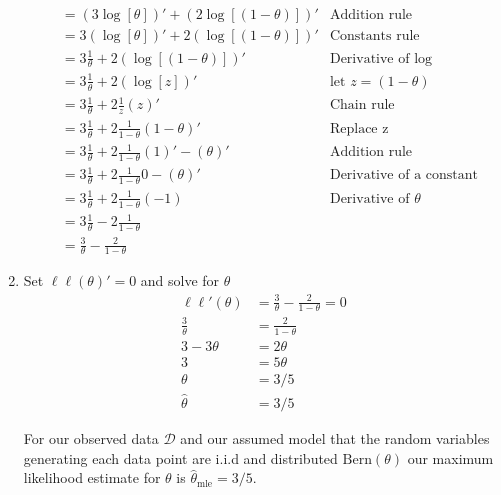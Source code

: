 \begin{enumerate}
\begin{align*}
                             &= \left( 3 \log [\theta] \right)' + \left(2 \log [ (1-\theta)] \right)' & \text{Addition rule}\\
                             &= 3 \left( \log [\theta] \right)' + 2 \left( \log [ (1-\theta)] \right)' & \text{Constants rule}\\
                             &= 3 \frac{1}{\theta} + 2 \left( \log [ (1-\theta)] \right)' & \text{Derivative of log}\\
                             &= 3 \frac{1}{\theta} + 2 \left( \log [ z ] \right)' & \text{let } z=(1-\theta)\\
                             &= 3 \frac{1}{\theta} + 2 \frac{1}{z} (z)' & \text{Chain rule } \\
                             &= 3 \frac{1}{\theta} + 2 \frac{1}{1-\theta} (1-\theta)' & \text{Replace z} \\
                             &= 3 \frac{1}{\theta} + 2 \frac{1}{1-\theta} (1)' - (\theta)' & \text{Addition rule} \\
                             &= 3 \frac{1}{\theta} + 2 \frac{1}{1-\theta} 0 - (\theta)' & \text{Derivative of a constant} \\
                             &= 3 \frac{1}{\theta} + 2 \frac{1}{1-\theta} (-1) & \text{Derivative of } \theta \\
                             &= 3 \frac{1}{\theta} - 2 \frac{1}{1-\theta}\\
                             &= \frac{3}{\theta} -  \frac{2}{1-\theta}
    \end{align*}
    \item Set $\ell \ell(\theta)' = 0$ and solve for $\theta$
    \begin{align*}
        \ell \ell ' (\theta) &= \frac{3}{\theta} -  \frac{2}{1-\theta} = 0\\
        \frac{3}{\theta} &=  \frac{2}{1-\theta}\\
        3 - 3\theta &=  2 \theta \\
        3  &=  5 \theta \\
        \theta &= 3/5\\ 
        \hat {\theta} &= 3/5 
    \end{align*}

For our observed data $\mathcal{D}$ and our assumed model that the random variables generating each data point are i.i.d and distributed $\text{Bern}(\theta)$ our maximum likelihood estimate for $\theta$ is $\hat{\theta}_{\text{mle}} = 3/5$.

\end{enumerate}

